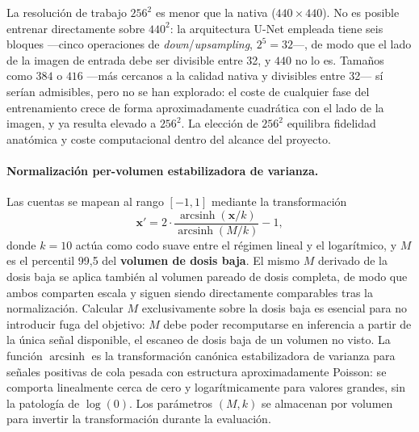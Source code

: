 La resolución de trabajo $256^2$ es menor que la nativa
($440 \times 440$). No es posible entrenar directamente sobre
$440^2$: la arquitectura U-Net empleada tiene seis bloques —cinco
operaciones de \textit{down}/\textit{upsampling}, $2^5 = 32$—, de
modo que el lado de la imagen de entrada debe ser divisible entre
32, y $440$ no lo es. Tamaños como $384$ o $416$ —más cercanos a
la calidad nativa y divisibles entre 32— sí serían admisibles,
pero no se han explorado: el coste de cualquier fase del
entrenamiento crece de forma aproximadamente cuadrática con el
lado de la imagen, y ya resulta elevado a $256^2$. La elección de
$256^2$ equilibra fidelidad anatómica y coste computacional dentro
del alcance del proyecto.

\paragraph{Normalización per-volumen estabilizadora de varianza.}
Las cuentas se mapean al rango $[-1, 1]$ mediante la
transformación
\begin{equation}
    \mathbf{x}' = 2 \cdot
        \frac{\operatorname{arcsinh}(\mathbf{x}/k)}
             {\operatorname{arcsinh}(M/k)}
        - 1,
\end{equation}
donde $k = 10$ actúa como codo suave entre el régimen lineal y
el logarítmico, y $M$ es el percentil 99,5 del \textbf{volumen de
dosis baja}. El mismo $M$ derivado de la dosis baja se aplica
también al volumen pareado de dosis completa, de modo que ambos
comparten escala y siguen siendo directamente comparables tras la
normalización. Calcular $M$ exclusivamente sobre la dosis baja es
esencial para no introducir fuga del objetivo: $M$ debe poder
recomputarse en inferencia a partir de la única señal disponible,
el escaneo de dosis baja de un volumen no visto. La función
$\operatorname{arcsinh}$ es la transformación canónica
estabilizadora de varianza para señales positivas de cola pesada
con estructura aproximadamente Poisson: se comporta linealmente
cerca de cero y logarítmicamente para valores grandes, sin la
patología de $\log(0)$. Los parámetros $(M, k)$ se almacenan por
volumen para invertir la transformación durante la evaluación.

